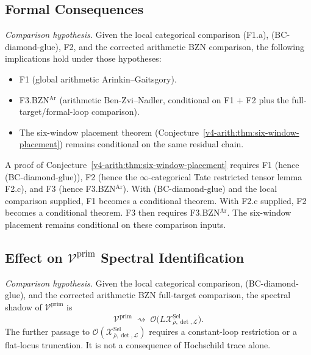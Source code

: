 \subsection{Formal Consequences}

\begin{corollary}
\label{v4-arith:acd:cor:consequent-form}
\emph{Comparison hypothesis.} Given the local categorical comparison
(F1.a), (BC-diamond-glue), F2, and the corrected arithmetic BZN
comparison, the following implications hold under those hypotheses:
\begin{itemize}
\item F1 (global arithmetic Arinkin--Gaitsgory).
\item F3.BZN\(^{\mathrm{Ar}}\) (arithmetic Ben-Zvi--Nadler, conditional
on F1 \(+\) F2 plus the full-target/formal-loop comparison).
\item The six-window placement theorem
(Conjecture~\ref{v4-arith:thm:six-window-placement}) remains conditional on
the same residual chain.
\end{itemize}
\end{corollary}

\begin{remark}
\label{v4-arith:acd:rem:six-window-upgrade}
A proof of Conjecture~\ref{v4-arith:thm:six-window-placement} requires F1 (hence
(BC-diamond-glue)), F2 (hence the \(\infty\)-categorical Tate
restricted tensor lemma F2.c), and F3 (hence F3.BZN\(^{\mathrm{Ar}}\)).
With (BC-diamond-glue) and the local comparison supplied, F1 becomes a
conditional theorem.  With F2.c supplied, F2 becomes a conditional
theorem.  F3 then requires F3.BZN\(^{\mathrm{Ar}}\). The six-window
placement remains conditional on these comparison inputs.
\end{remark}

\subsection{Effect on \(\mathcal{V}^{\mathrm{prim}}\) Spectral Identification}

\begin{corollary}
\label{v4-arith:acd:cor:V-prim-spectral}
\emph{Comparison hypothesis.} Given the local categorical comparison,
(BC-diamond-glue), and the corrected arithmetic BZN full-target
comparison, the spectral shadow of \(\mathcal{V}^{\mathrm{prim}}\) is
\begin{equation}
\mathcal{V}^{\mathrm{prim}}\;\rightsquigarrow\;
\mathcal{O}\bigl(L\mathcal{X}^{\mathrm{Sel}}_{\bar\rho,\det,\mathcal{L}}\bigr).
\end{equation}
The further passage to
\(\mathcal{O}(\mathcal{X}^{\mathrm{Sel}}_{\bar\rho,\det,\mathcal{L}})\)
requires a constant-loop restriction or a flat-locus truncation. It is
not a consequence of Hochschild trace alone.
\end{corollary}

